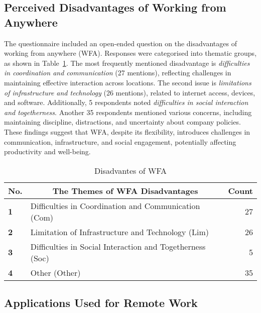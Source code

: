 \documentclass[conference]{IEEEtran}
\begin{document}
\subsection{Perceived Disadvantages of Working from Anywhere}
\label{sec:disadvantage-wfa}

The questionnaire included an open-ended question on the disadvantages of working from anywhere (WFA). Responses were categorised into thematic groups, as shown in Table~\ref{Disadvantages of WFA}. The most frequently mentioned disadvantage is \textit{difficulties in coordination and communication} (27 mentions), reflecting challenges in maintaining effective interaction across locations. The second issue is \textit{limitations of infrastructure and technology} (26 mentions), related to internet access, devices, and software. Additionally, 5 respondents noted \textit{difficulties in social interaction and togetherness}. Another 35 respondents mentioned various concerns, including maintaining discipline, distractions, and uncertainty about company policies. These findings suggest that WFA, despite its flexibility, introduces challenges in communication, infrastructure, and social engagement, potentially affecting productivity and well-being.

\begin{table}
	\centering
	\caption{Disadvantes of WFA}
	\label{Disadvantages of WFA}
	\begin{tabular}{|p{}|p{}|r|}
		\hline
		\multicolumn{1}{|c|}{\textbf{No.}} & \multicolumn{1}{c|}{\textbf{The Themes of WFA Disadvantages}} & \multicolumn{1}{c|}{\textbf{Count}} \\ \hline
		\textbf{1}                 & Difficulties in Coordination and Communication (Com)   & 27 %
		\\ \hline
		\textbf{2}                 & Limitation of Infrastructure and Technology (Lim)    & 26 %
		\\ \hline
		\textbf{3}                 & Difficulties in Social Interaction and Togetherness (Soc) & 5 %
		\\ \hline
		\textbf{4}                 & Other (Other) & 35 %
		\\ \hline
	\end{tabular}
\end{table}

\subsection{Applications Used for Remote Work}
\label{sec:used-applications}
\end{document}

